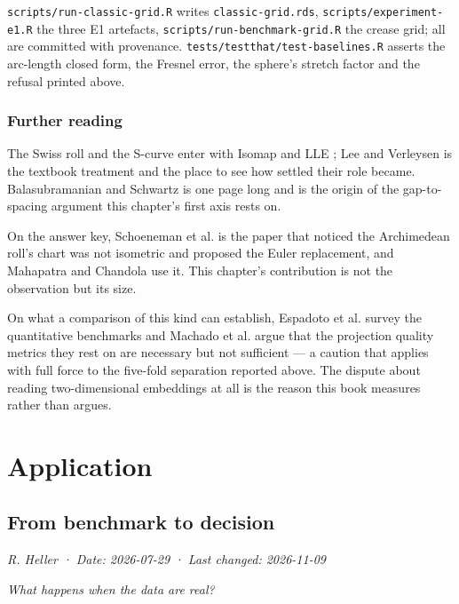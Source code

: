 \documentclass[
  british,
  a4paper,
]{book}
\begin{document}
\texttt{scripts/run-classic-grid.R} writes \texttt{classic-grid.rds}, \texttt{scripts/experiment-e1.R}
the three E1 artefacts, \texttt{scripts/run-benchmark-grid.R} the crease grid; all are
committed with provenance. \texttt{tests/testthat/test-baselines.R} asserts the
arc-length closed form, the Fresnel error, the sphere's stretch factor and the
refusal printed above.

\section{Further reading}\label{comp-reading}

The Swiss roll and the S-curve enter with Isomap \citep{tenenbaum2000isomap} and LLE
\citep{roweis2000lle}; Lee and Verleysen \citep{lee2007nonlinear} is the textbook treatment
and the place to see how settled their role became. Balasubramanian and Schwartz
\citep{balasubramanian2002isomap} is one page long and is the origin of the
gap-to-spacing argument this chapter's first axis rests on.

On the answer key, Schoeneman et al. \citep{schoeneman2017error} is the paper that
noticed the Archimedean roll's chart was not isometric and proposed the Euler
replacement, and Mahapatra and Chandola \citep{mahapatra2018learning} use it. This
chapter's contribution is not the observation but its size.

On what a comparison of this kind can establish, Espadoto et al.
\citep{espadoto2021survey} survey the quantitative benchmarks and Machado et al.
\citep{machado2025necessary} argue that the projection quality metrics they rest on
are necessary but not sufficient --- a caution that applies with full force to the
five-fold separation reported above. The dispute about reading two-dimensional
embeddings at all \citep{chari2023specious, lause2024elephant} is the reason this
book measures rather than argues.

\part{Application}\label{part-application}

\chapter{From benchmark to decision}\label{application}

\emph{R. Heller · Date: 2026-07-29 · Last changed: 2026-11-09}

\emph{What happens when the data are real?}
\end{document}

